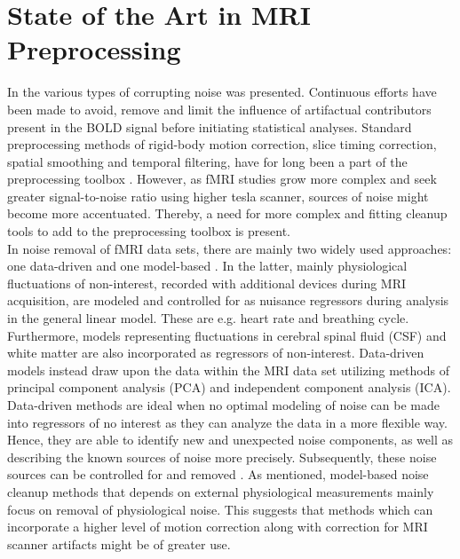 \section{State of the Art in MRI Preprocessing} \label{art}

In  the various types of corrupting noise was presented. Continuous efforts have been made to avoid, remove and limit the influence of artifactual contributors present in the BOLD signal before initiating statistical analyses. Standard preprocessing methods of rigid-body motion correction, slice timing correction, spatial smoothing and temporal filtering, have for long been a part of the preprocessing toolbox \cite{Poldrack2011,Salimi-Khorshidi2014}. However, as fMRI studies grow more complex and seek greater signal-to-noise ratio using higher tesla scanner, sources of noise might become more accentuated. Thereby, a need for more complex and fitting cleanup tools to add to the preprocessing toolbox is present. \cite{Wood2012,Liu2006} \\
In noise removal of fMRI data sets, there are mainly two widely used approaches: one data-driven and one model-based \cite{Salimi-Khorshidi2014,Iraji2016}. In the latter, mainly physiological fluctuations of non-interest, recorded with additional devices during MRI acquisition, are modeled and controlled for as nuisance regressors during analysis in the general linear model. These are e.g. heart rate and breathing cycle. Furthermore, models representing fluctuations in cerebral spinal fluid (CSF) and white matter are also incorporated as regressors of non-interest. \cite{Salimi-Khorshidi2014,Iraji2016,Monti2011} Data-driven models instead draw upon the data within the MRI data set utilizing methods of principal component analysis (PCA) and independent component analysis (ICA). Data-driven methods are ideal when no optimal modeling of noise can be made into regressors of no interest as they can analyze the data in a more flexible way. Hence, they are able to identify new and unexpected noise components, as well as describing the known sources of noise more precisely. Subsequently, these noise sources can be controlled for and removed . \cite{Iraji2016} As mentioned, model-based noise cleanup methods that depends on external physiological measurements mainly focus on removal of physiological noise. This suggests that methods which can incorporate a higher level of motion correction along with correction for MRI scanner artifacts might be of greater use. \\
%
